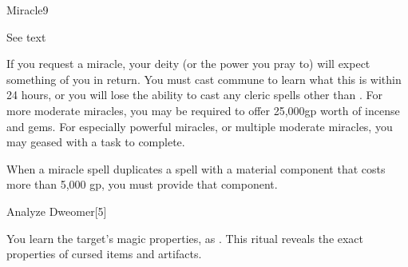 \begin{spellsection}{Miracle}{9}
\begin{spellcontent}
\begin{spelleffects}
            \spelldur See text
        \end{spelleffects}
    \end{spellcontent}
    \begin{spellfooter}
        \spellnotes If you request a miracle, your deity (or the power you pray to) will expect something of you in return. You must cast commune to learn what this is within 24 hours, or you will lose the ability to cast any cleric spells other than . For more moderate miracles, you may be required to offer 25,000gp worth of incense and gems. For especially powerful miracles, or multiple moderate miracles, you may geased with a task to complete.
        \par When a miracle spell duplicates a spell with a material component that costs more than 5,000 gp, you must provide that component.
    \end{spellfooter}
\end{spellsection}

\begin{spellsection}{Analyze Dweomer}[5]
    \begin{spellheader}
    \end{spellheader}
    \begin{spellcontent}
        \begin{spelltargetinginfo}
        \end{spelltargetinginfo}
        \begin{spelleffects}
            \spelleffect You learn the target's magic properties, as . This ritual reveals the exact properties of cursed items and artifacts.
        \end{spelleffects}
    \end{spellcontent}
    \begin{spellfooter}
    \end{spellfooter}
\end{spellsection}

